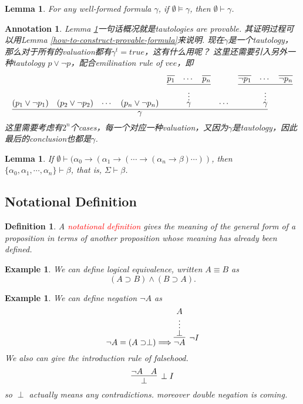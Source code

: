 \documentclass{article}
\theoremstyle{plain}
\newtheorem{lemma}[theorem]{Lemma}
\newtheorem{example}[theorem]{Example}
\newtheorem{definition}[theorem]{Definition}
\newtheorem{annotation}[theorem]{Annotation}
\theoremstyle{nonumberplain}
\newcommand{\redt}[1]{\textcolor{red}{#1}}
\begin{document}
\begin{lemma}\label{tautologies-are-provable}
\rm For any well-formed formula $\gamma$, if $\emptyset \vDash \gamma$, then $\emptyset \vdash \gamma$. 
\end{lemma}

\begin{annotation}
\rm Lemma \ref{tautologies-are-provable}一句话概况就是tautologies are provable. 其证明过程可以用Lemma \ref{how-to-construct-provable-formula}来说明. 现在$\gamma$是一个tautology，那么对于所有的valuation都有$\gamma^t = true$，这有什么用呢？ 这里还需要引入另外一种tautology $p \vee \neg p$，配合emilination rule of $vee$，即
$$
\infer{\gamma}{(p_1 \vee \neg p_1) & (p_2 \vee \neg p_2) & \cdots & (p_n \vee \neg p_n)&\deduce[\vdots]{\gamma}{\infer{}{\infer{p_1}{} & \cdots & \infer{p_n}{}}} & \cdots & \deduce[\vdots]{\gamma}{\infer{}{\infer{\neg p_1}{} & \cdots & \infer{\neg p_n}{}}}}
$$
这里需要考虑有$2^n$个cases，每一个对应一种valuation，又因为$\gamma$是tautology，因此最后的conclusion也都是$\gamma$. 
\end{annotation}

\begin{lemma}
\rm If $\emptyset \vdash (\alpha_0 \to (\alpha_1 \to (\cdots \to (\alpha_n \to \beta)\cdots))$, then $\{\alpha_0, \alpha_1,\cdots,\alpha_n\} \vdash \beta$, that is, $\Sigma \vdash \beta$. 
\end{lemma}

\newpage
\subsection{Notational Definition}

\begin{definition}
\rm A \redt{notational definition} gives the meaning of the general form of a proposition in terms of another proposition whose meaning has already been defined.
\end{definition}

\begin{example}
\rm We can define logical equivalence, written $A \equiv B$ as 
$$
(A \supset B) \wedge (B \supset A).
$$ 
\end{example}

\begin{example}
\rm We can define negation $\neg A$ as 
$$
\neg A = (A \supset \perp) \Longrightarrow \infer[\neg I]{\neg A}{\deduce[\vdots]{\perp}{A}}
$$
We also can give the introduction rule of falsehood.
$$
\infer[\perp I]{\perp}{\neg A & A}
$$
so $\perp$ actually means any contradictions. moreover double negation is coming.
\end{example}
\end{document}
